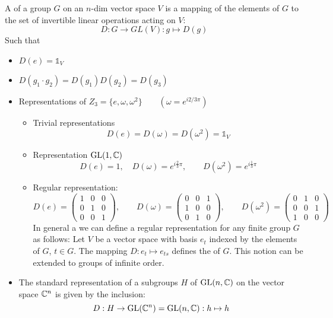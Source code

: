 \begin{definition}
A  of a group $G$ on an $n$-dim vector space $V$ is a mapping of the elements of $G$ to the set of invertible linear operations acting on $V$:
\[D: G \rightarrow GL(V): g \mapsto D(g)\]
Such that
\begin{itemize}
\item $D(e) = \mathbb{1}_V$
\item $D(g_1\cdot g_2) = D(g_1)D(g_2) = D(g_3)$
\end{itemize}
\end{definition}

\begin{example}
\begin{itemize}
\item Representations of $Z_3 = \{e,\omega, \omega^2\} \qquad (\omega = e^{i2/3\pi})$
\begin{itemize}
\item Trivial representations
\[D(e) = D(\omega) = D(\omega^2) = \mathbb{1}_V\]
\item Representation $\operatorname{GL}(1, \mathbb{C})$
\[ D(e) = 1, \quad D(\omega) = e^{i\frac{2}{3}\pi} , \qquad D(\omega^2) = e^{i\frac{1}{3}\pi} \]
\item Regular representation:
\[D(e) = 
\begin{pmatrix}
1&0&0\\0&1&0\\0&0&1
\end{pmatrix}, \qquad D(\omega) = \begin{pmatrix}
0&0&1\\1&0&0\\0&1&0
\end{pmatrix}, \qquad D(\omega^2) = \begin{pmatrix}
0&1&0\\0&0&1\\1&0&0
\end{pmatrix}
\]
In general a we can define a regular representation for any finite group $G$ as follows: Let $V$ be a vector space with basis $e_t$ indexed by the elements of $G$, $t \in G$. The mapping $D: e_t \mapsto e_{ts}$ defines the  of $G$. This notion can be extended to groups of infinite order.
\end{itemize}
\item The standard representation of a subgroups $H$ of $\operatorname{GL}(n,\mathbb{C})$ on the vector space $\mathbb{C}^n$ is given by the inclusion:
\[ D: H \to \operatorname{GL}(\mathbb{C}^n) = \operatorname{GL}(n,\mathbb{C}): h \mapsto h \]
\end{itemize}
\end{example}


